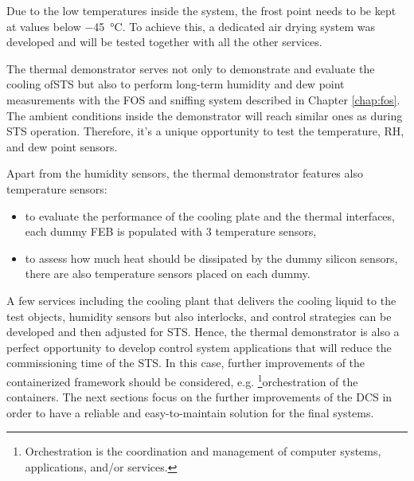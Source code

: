 Due to the low temperatures inside the system, the frost point needs to be kept at values below \SI{-45}{\celsius}. To achieve this, a dedicated air drying system was developed and will be tested together with all the other services. 
 
 The thermal demonstrator serves not only to demonstrate and evaluate the cooling of\gls{STS} but also to perform long-term humidity and dew point measurements with the \gls{FOS} and sniffing system described in Chapter \ref{chap:fos}. The ambient conditions inside the demonstrator will reach similar ones as during \gls{STS} operation. Therefore, it's a unique opportunity to test the temperature, RH, and dew point sensors.
 
 Apart from the humidity sensors, the thermal demonstrator features also temperature sensors:
 \begin{itemize}
     \item to evaluate the performance of the cooling plate and the thermal interfaces, each dummy \gls{FEB} is populated with 3 temperature sensors,
     \item to assess how much heat should be dissipated by the dummy silicon sensors, there are also temperature sensors placed on each dummy.
 \end{itemize}

A few services including the cooling plant that delivers the cooling liquid to the test objects, humidity sensors but also interlocks, and control strategies can be developed and then adjusted for \gls{STS}. Hence, the thermal demonstrator is also a perfect opportunity to develop control system applications that will reduce the commissioning time of the \gls{STS}. In this case, further improvements of the containerized framework should be considered, e.g. \footnote{Orchestration is the coordination and management of computer systems, applications, and/or services.}{orchestration} of the containers. The next sections focus on the further improvements of the \gls{DCS} in order to have a reliable and easy-to-maintain solution for the final systems. 